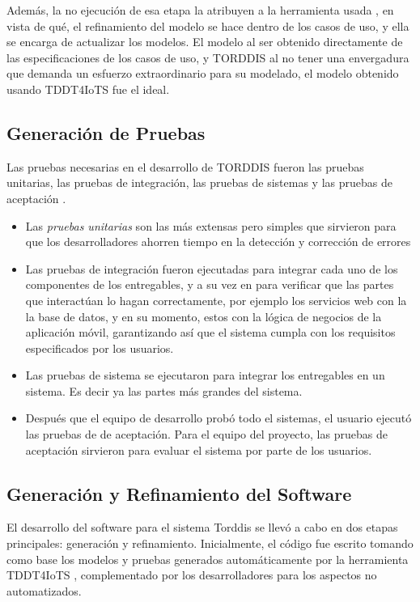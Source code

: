 \documentclass[a4paper,fleqn]{cas-sc}
\begin{document}
			Además, la no ejecución de esa etapa la atribuyen a la herramienta usada \cite{Guerrero2024Test}, en vista de qué, el refinamiento del modelo se hace dentro de los casos de uso, y ella se encarga de actualizar los modelos. El modelo al ser obtenido directamente de las especificaciones de los casos de uso, y TORDDIS al no tener una envergadura que demanda un esfuerzo extraordinario para su modelado, el modelo obtenido usando TDDT4IoTS fue el ideal.
			
		\subsection{Generación de Pruebas}
			Las pruebas necesarias en el desarrollo de TORDDIS fueron las pruebas unitarias, las pruebas de integración, las pruebas de sistemas y las pruebas de aceptación \cite{Sciarra2024Smash}.
			
			\begin{itemize}
				\item Las \textit{pruebas unitarias} son las más extensas pero simples que sirvieron para que los desarrolladores ahorren tiempo en la detección y corrección de errores \cite{Mafi2024Regression}
				\item Las pruebas de integración fueron ejecutadas para integrar cada uno de los componentes de los entregables, y a su vez en para verificar que las partes que interactúan lo hagan correctamente, por ejemplo los servicios web con la la base de datos, y en su momento, estos con la lógica de negocios de la aplicación móvil, garantizando así que el sistema cumpla con los requisitos especificados por los usuarios.
				\item Las pruebas de sistema se ejecutaron para integrar los entregables en un sistema. Es decir ya las partes más grandes del sistema.
				\item Después que el equipo de desarrollo probó todo el sistemas, el usuario ejecutó las pruebas de de aceptación. Para el equipo del proyecto, las pruebas de aceptación sirvieron para evaluar el sistema por parte de los usuarios.
			\end{itemize}
			 
		\subsection{Generación y Refinamiento del Software} 
			El desarrollo del software para el sistema Torddis se llevó a cabo en dos etapas principales: generación y refinamiento. Inicialmente, el código fue escrito tomando como base los modelos y pruebas generados automáticamente por la herramienta TDDT4IoTS \cite{Guerrero2024Test}, complementado por los desarrolladores para los aspectos no automatizados. 
			
\end{document}

